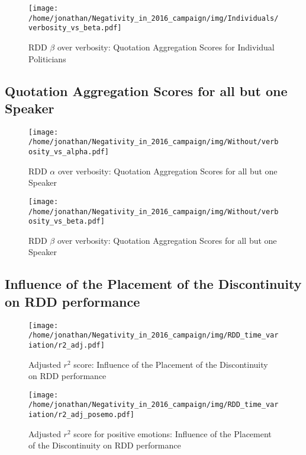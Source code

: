 \begin{figure}[h]\centering
	\texttt{[image: /home/jonathan/Negativity\_in\_2016\_campaign/img/Individuals/verbosity\_vs\_beta.pdf]}
	\caption{RDD $\beta$ over verbosity: Quotation Aggregation Scores for Individual Politicians}
	\label{fig: individuals_RDD beta over verbosity}
\end{figure}

\clearpage
\pagebreak

\subsection{Quotation Aggregation Scores for all but one Speaker}

\begin{figure}[h]\centering
	\texttt{[image: /home/jonathan/Negativity\_in\_2016\_campaign/img/Without/verbosity\_vs\_alpha.pdf]}
	\caption{RDD $\alpha$ over verbosity: Quotation Aggregation Scores for all but one Speaker}
	\label{fig: ablation_RDD alpha over verbosity}
\end{figure}

\begin{figure}[h]\centering
	\texttt{[image: /home/jonathan/Negativity\_in\_2016\_campaign/img/Without/verbosity\_vs\_beta.pdf]}
	\caption{RDD $\beta$ over verbosity: Quotation Aggregation Scores for all but one Speaker}
	\label{fig: ablation_RDD beta over verbosity}
\end{figure}

\clearpage
\pagebreak

\subsection{Influence of the Placement of the Discontinuity on RDD performance}

\begin{figure}[h]\centering
	\texttt{[image: /home/jonathan/Negativity\_in\_2016\_campaign/img/RDD\_time\_variation/r2\_adj.pdf]}
	\caption{Adjusted $r^2$ score: Influence of the Placement of the Discontinuity on RDD performance}
	\label{fig: rddtv_Adjusted r^2 score}
\end{figure}

\begin{figure}[h]\centering
	\texttt{[image: /home/jonathan/Negativity\_in\_2016\_campaign/img/RDD\_time\_variation/r2\_adj\_posemo.pdf]}
	\caption{Adjusted $r^2$ score for positive emotions: Influence of the Placement of the Discontinuity on RDD performance}
	\label{fig: rddtv_Adjusted r^2 score for positive emotions}
\end{figure}

\clearpage
\pagebreak

